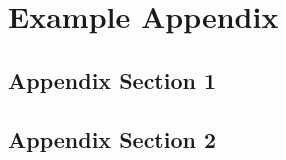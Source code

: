 %
\chapter{Example Appendix}
\label{sec:appendix}

\section{Appendix Section 1}
\label{sec:appendix:sec1}


\section{Appendix Section 2}
\label{sec:appendix:sec2}

